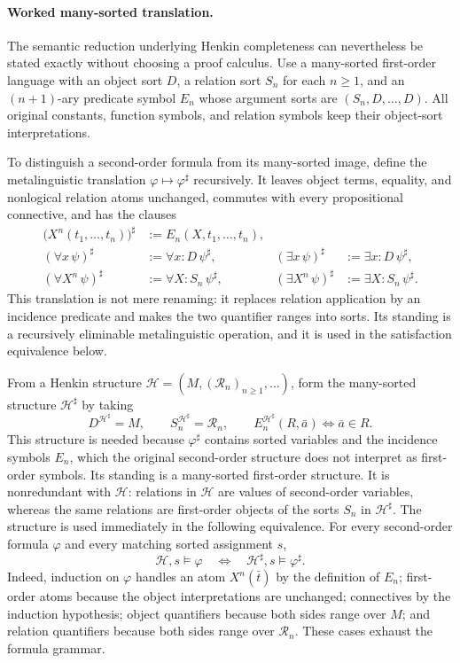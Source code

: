 \documentclass[11pt,oneside,openany]{book}
\theoremstyle{definition}
\theoremstyle{plain}
\theoremstyle{remark}
\newcommand{\entails}{\models}
\newcommand{\defeq}{\mathrel{:=}}
\begin{document}
\paragraph{Worked many-sorted translation.}
The semantic reduction underlying Henkin completeness can nevertheless be
stated exactly without choosing a proof calculus.  Use a many-sorted
first-order language with an object sort \(D\), a relation sort \(S_n\) for
each \(n\geq1\), and an \((n+1)\)-ary predicate symbol \(E_n\) whose argument
sorts are \((S_n,D,\ldots,D)\).  All original constants, function symbols, and
relation symbols keep their object-sort interpretations.

To distinguish a second-order formula from its many-sorted image, define the
metalinguistic translation \(\varphi\mapsto\varphi^\sharp\) recursively.  It
leaves object terms, equality, and nonlogical relation atoms unchanged,
commutes with every propositional connective, and has the clauses
\[
\begin{aligned}
  \bigl(X^n(t_1,\ldots,t_n)\bigr)^\sharp
    &\defeq E_n(X,t_1,\ldots,t_n),\\
  (\forall x\,\psi)^\sharp
    &\defeq\forall x{:}D\,\psi^\sharp,
  & (\exists x\,\psi)^\sharp
    &\defeq\exists x{:}D\,\psi^\sharp,\\
  (\forall X^n\,\psi)^\sharp
    &\defeq\forall X{:}S_n\,\psi^\sharp,
  & (\exists X^n\,\psi)^\sharp
    &\defeq\exists X{:}S_n\,\psi^\sharp.
\end{aligned}
\]
This translation is not mere renaming: it replaces relation application by an
incidence predicate and makes the two quantifier ranges into sorts.  Its
standing is a recursively eliminable metalinguistic operation, and it is used
in the satisfaction equivalence below.

From a Henkin structure
\(\mathcal H=(M,(\mathcal R_n)_{n\geq1},\ldots)\), form the many-sorted
structure \(\mathcal H^\sharp\) by taking
\[
  D^{\mathcal H^\sharp}=M,
  \qquad
  S_n^{\mathcal H^\sharp}=\mathcal R_n,
  \qquad
  E_n^{\mathcal H^\sharp}(R,\bar a)
  \Longleftrightarrow \bar a\in R.
\]
This structure is needed because \(\varphi^\sharp\) contains sorted variables
and the incidence symbols \(E_n\), which the original second-order structure
does not interpret as first-order symbols.  Its standing is a many-sorted
first-order structure.  It is nonredundant with \(\mathcal H\): relations in
\(\mathcal H\) are values of second-order variables, whereas the same
relations are first-order objects of the sorts \(S_n\) in
\(\mathcal H^\sharp\).  The structure is used immediately in the following
equivalence.
For every second-order formula \(\varphi\) and every matching sorted assignment
\(s\),
\[
  \mathcal H,s\entails\varphi
  \quad\Longleftrightarrow\quad
  \mathcal H^\sharp,s\entails\varphi^\sharp.
\]
Indeed, induction on \(\varphi\) handles an atom \(X^n(\bar t)\) by the
definition of \(E_n\); first-order atoms because the object interpretations are
unchanged; connectives by the induction hypothesis; object quantifiers because
both sides range over \(M\); and relation quantifiers because both sides range
over \(\mathcal R_n\).  These cases exhaust the formula grammar.
\end{document}
